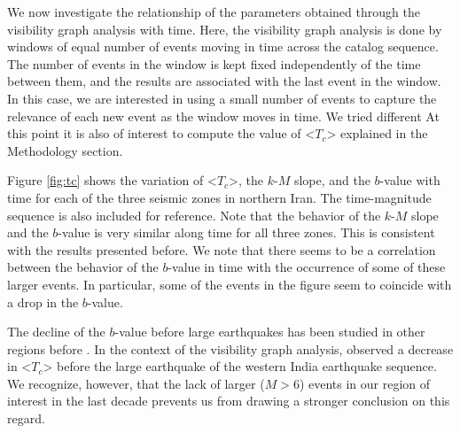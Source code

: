 We now investigate the relationship of the parameters obtained through the visibility graph analysis with time. Here, the visibility graph analysis is done by windows of equal number of events moving in time across the catalog sequence. The number of events in the window is kept fixed independently of the time between them, and the results are associated with the last event in the window. In this case, we are interested in using a small number of events to capture the relevance of each new event as the window moves in time. We tried different   At this point it is also of interest to compute the value of <$T_c$> explained in the Methodology section.

Figure \ref{fig:tc} shows the variation of <$T_c$>, the $k$-$M$ slope, and the $b$-value with time for each of the three seismic zones in northern Iran. The time-magnitude sequence is also included for reference. Note that the behavior of the $k$-$M$ slope and the $b$-value is very similar along time for all three zones.  This is consistent with the results presented before. We note that there seems to be a correlation between the behavior of the $b$-value in time with the occurrence of some of these larger events. In particular, some of the events in the figure seem to coincide with a drop in the $b$-value. 

The decline of the $b$-value before large earthquakes has been studied in other regions before \citep[e.g.,][]{Wyss2000, Wyss2006, Schorlemmer2005, Chan2012}. In the context of the visibility graph analysis, \citet{Telesca2016} observed a decrease in <$T_c$> before the large earthquake of the western India earthquake sequence. We recognize, however, that the lack of larger ($M>6$) events in our region of interest in the last decade prevents us from drawing a stronger conclusion on this regard. 
